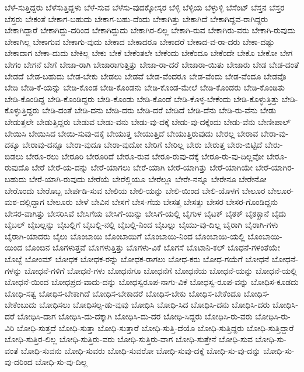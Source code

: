 {ಬೆಳೆ-ಸುತ್ತಿದ್ದರು
ಬೆಳೆಸುತ್ತಿದ್ದಳು
ಬೆಳೆ-ಸುವ
ಬೆಳೆಸು-ವುದಕ್ಕೋಸ್ಕರ
ಬೆಳ್ಳಿ
ಬೆಳ್ಳಿಯ
ಬೆಳ್ಳುಳ್ಳಿ
ಬೆಸೆಂಟ್
ಬೆಸ್ತನ
ಬೆಸ್ತರ
ಬೆಸ್ತರು
ಬೇಕಂತೆ
ಬೇಕಾಗ-ಬಹುದು
ಬೇಕಾಗ-ಬಹು-ದೆಂದು
ಬೇಕಾಗಿತ್ತು
ಬೇಕಾಗಿದೆ
ಬೇಕಾಗಿದ್ದವ-ರಾಗಿದ್ದರು
ಬೇಕಾಗಿದ್ದಾರೆ
ಬೇಕಾಗಿದ್ದು-ದರಿಂದ
ಬೇಕಾಗಿದ್ದುದು
ಬೇಕಾಗಿರ-ಲಿಲ್ಲ
ಬೇಕಾಗಿ-ರುವ
ಬೇಕಾಗಿರು-ವರು
ಬೇಕಾಗಿ-ರುವುದು
ಬೇಕಾಗಿಲ್ಲ
ಬೇಕಾಗುವ
ಬೇಕಾಗು-ವುದು
ಬೇಕಾದ
ಬೇಕಾದರೂ
ಬೇಕಾದರೆ
ಬೇಕಾದ-ವ-ರಾ-ದರು
ಬೇಕಾ-ದಷ್ಟು
ಬೇಕಾದಾಗ
ಬೇಕಾ-ದುದು
ಬೇಕಿಲ್ಲ
ಬೇಕು
ಬೇಕೆ
ಬೇಕೆಂತಲೇ
ಬೇಕೆಂದು
ಬೇಕೆಂದೂ
ಬೇಕೆಂದೇ
ಬೇಕೊ
ಬೇಕೋ
ಬೇಗ
ಬೇಗಂ
ಬೇಗನೆ
ಬೇಗೆ
ಬೇಜಾ-ರಾಗಿ
ಬೇಜಾರಾಗುತ್ತಿತ್ತು
ಬೇಜಾ-ರಾ-ದರೆ
ಬೇಜಾರಾ-ಯಿತು
ಬೇಜಾರು
ಬೇಡ
ಬೇಡ-ದಂತೆ
ಬೇಡದೆ
ಬೇಡ-ಬಹುದು
ಬೇಡ-ಬೇಕು
ಬೇಡಲು
ಬೇಡವೆ
ಬೇಡ-ವೆಂದರೂ
ಬೇಡ-ವೆಂದು
ಬೇಡ-ವೆಂದೂ
ಬೇಡವೊ
ಬೇಡಿ
ಬೇಡಿ-ಕೆ-ಯನ್ನು
ಬೇಡಿ-ಕೊಂಡ
ಬೇಡಿ-ಕೊಂಡನು
ಬೇಡಿ-ಕೊಂಡ-ಮೇಲೆ
ಬೇಡಿ-ಕೊಂಡರು
ಬೇಡಿ-ಕೊಂಡಿತು
ಬೇಡಿ-ಕೊಂಡಿದ್ದ
ಬೇಡಿ-ಕೊಂಡಿದ್ದರು
ಬೇಡಿ-ಕೊಂಡು
ಬೇಡಿ-ಕೊಂಡೆ
ಬೇಡಿ-ಕೊಳ್ಳ-ಬೇಕೆಂದು
ಬೇಡಿ-ಕೊಳ್ಳುತ್ತಿತ್ತು
ಬೇಡಿ-ಕೊಳ್ಳುತ್ತಿದ್ದರು
ಬೇಡಿ-ದಂತೆ
ಬೇಡಿ-ದನು
ಬೇಡಿ-ದರು
ಬೇಡಿ-ದರೆ
ಬೇಡಿದೆ
ಬೇಡಿ-ದೆನು
ಬೇಡಿ-ರು-ವೆನು
ಬೇಡು
ಬೇಡುತ್ತಲೇ
ಬೇಡುತ್ತಿದ್ದರು
ಬೇಡುವ
ಬೇಡು-ವನು
ಬೇಡು-ವು-ದಕ್ಕೆ
ಬೇಡು-ವು-ದಕ್ಕೆಂದು
ಬೇಡು-ವೆನು
ಬೇಣೀಪಾಲ್
ಬೇಯಿಸಿ
ಬೇಯಿಸಿದ
ಬೇಯಿ-ಸುವು-ದಕ್ಕೆ
ಬೇಯುತ್ತ
ಬೇಯುತ್ತಿದೆ
ಬೇಯುತ್ತಿರುವುದು
ಬೇರಲ್ಲ
ಬೇರಾವ
ಬೇರಾ-ವು-ದಕ್ಕೂ
ಬೇರಾವು-ದನ್ನೂ
ಬೇರಾ-ವುದೂ
ಬೇರಾ-ವುದೋ
ಬೇರಿಗೆ
ಬೇರಿಲ್ಲ
ಬೇರು
ಬೇರುತ್ತ
ಬೇರು-ಬಿಟ್ಟಿದೆ
ಬೇರು-ಬಿಡಲು
ಬೇರೂ-ರಲು
ಬೇರೂರಿ
ಬೇರೂರಿದೆ
ಬೇರೂ-ರುವ
ಬೇರೂ-ರುವು-ದಕ್ಕೆ
ಬೇರೂ-ರು-ವು-ದಿಲ್ಲವೋ
ಬೇರೂ-ರುವುದೊ
ಬೇರೆ
ಬೇರೆ-ಯ-ದನ್ನು
ಬೇರೆ-ಯಾಗಲು
ಬೇರೆ-ಯಾಗಿ
ಬೇರೆ-ಯಾಗಿತ್ತು
ಬೇರೆ-ಯಾಗಿಯೇ
ಬೇರೆ-ಯಾಗಿರ-ಬಹುದು
ಬೇರೆ-ಯಾಗಿ-ರುವುದು
ಬೇರೆಯೆ
ಬೇರೆಲ್ಲಿಯೂ
ಬೇರೆಲ್ಲೂ
ಬೇರೇ-ನನ್ನೂ
ಬೇರೇನೂ
ಬೇರೇನೋ
ಬೇರೊಂದು
ಬೇರೊಬ್ಬ
ಬೇರ್ಪಡಿ-ಸುವ
ಬೇಲಿಯ
ಬೇಲಿ-ಯನ್ನು
ಬೇಲಿ-ಯಿಂದ
ಬೇಲಿ-ಯೊಳಗೆ
ಬೇಲೂರ
ಬೇಲೂರ-ಮಠ-ದಲ್ಲಿದ್ದಾಗ
ಬೇಲೂರು
ಬೇಳೆ
ಬೇವಿನ
ಬೇಸಗೆ
ಬೇಸ-ಗೆಯ
ಬೇಸತ್ತ
ಬೇಸತ್ತು
ಬೇಸರ
ಬೇಸರ-ಗೊಂಡಿದ್ದನು
ಬೇಸರ-ವಾಗಿತ್ತು
ಬೇಸರಿಸಿವೆ
ಬೇಸಿಗೆಯ
ಬೇಸಿಗೆ-ಯನ್ನು
ಬೇಸಿಗೆ-ಯಲ್ಲಿ
ಬೈಗುಳ
ಬೈಟಕ್
ಬೈಠಕ್
ಬೈಠಕ್ಖಾನೆ
ಬೈದು
ಬೈಬಲ್
ಬೈಬಲ್ಲನ್ನು
ಬೈಬಲ್ಲಿಗೆ
ಬೈಬಲ್ಲಿ-ನಲ್ಲಿ
ಬೈಬಲ್ಲಿ-ನಿಂದ
ಬೈಬಲ್ಲು
ಬೈಯು-ವು-ದಿಲ್ಲ
ಬೈರಾಗಿ
ಬೈರಾಗಿ-ಗಳು
ಬೈರಾಗಿ-ಯಾದರು
ಬೈಲು
ಬೊಂಬಾಯಿ
ಬೊಂಬಾಯಿಗೆ
ಬೊಂಬಾಯಿ-ನಿಂದ
ಬೊಂಬಾಯಿ-ಯಲ್ಲಿ
ಬೊಂಬಾಯಿ-ಯಿಂದ
ಬೊಂಬಿನ
ಬೊಗಳುತ್ತವೆ
ಬೊಗಳುತ್ತಿತ್ತು
ಬೊಗಳು-ವಿಕೆ
ಬೊಗಸೆ
ಬೊಟಾನಿ-ಕಲ್
ಬೊಧನೆ-ಗಳಂತೆಯೇ
ಬೊಬ್ಬೆ
ಬೋಂಮ್
ಬೋಧಕ
ಬೋಧಕ-ರನ್ನು
ಬೋಧಕ-ರಾಗಲು
ಬೋಧ-ಕರು
ಬೋಧ-ಗಯೆಗೆ
ಬೋಧನೆ
ಬೋಧನೆ-ಗಳನ್ನು
ಬೋಧನೆ-ಗಳಿಗೆ
ಬೋಧನೆ-ಗಳು
ಬೋಧನೆಗೂ
ಬೋಧನೆಗೆ
ಬೋಧನೆಯ
ಬೋಧನೆ-ಯನ್ನು
ಬೋಧನೆ-ಯಲ್ಲಿ
ಬೋಧನೆ-ಯಿಂದ
ಬೋಧಪ್ರದ-ವಾದು-ದನ್ನು
ಬೋಧಸ್ವರೂಪ-ನಾಗು-ವಿಕೆ
ಬೋಧಸ್ವ-ರೂಪ-ವನ್ನು
ಬೋಧಿಸ-ಕೂಡದು
ಬೋಧಿ-ಸತ್ವ
ಬೋಧಿಸ-ಬೇಕಾಗಿದೆ
ಬೋಧಿಸ-ಬೇಕಾದರೆ
ಬೋಧಿಸ-ಬೇಕು
ಬೋಧಿಸ-ಬೇಕೆಂದೂ
ಬೋಧಿಸ-ಬೇಕೆಂಬುದು
ಬೋಧಿಸಲು
ಬೋಧಿಸಲ್ಪ-ಡು-ವುವು
ಬೋಧಿಸಿ
ಬೋಧಿ-ಸಿದ
ಬೋಧಿಸಿ-ದನು
ಬೋಧಿಸಿ-ದರು
ಬೋಧಿಸಿ-ದರೆ
ಬೋಧಿಸಿ-ದಾಗ
ಬೋಧಿಸಿ-ದು-ದಕ್ಕಾಗಿ
ಬೋಧಿಸಿ-ದು-ದರ
ಬೋಧಿ-ಸಿದ್ದರು
ಬೋಧಿಸಿ-ರು-ವರು
ಬೋಧಿಸಿ-ರು-ವಿರಿ
ಬೋಧಿ-ಸುತ್ತದೆ
ಬೋಧಿ-ಸುತ್ತಾ
ಬೋಧಿ-ಸುತ್ತಾರೆ
ಬೋಧಿ-ಸುತ್ತಿ-ದೆಯೊ
ಬೋಧಿ-ಸುತ್ತಿದ್ದರು
ಬೋಧಿ-ಸುತ್ತಿದ್ದಾರೆ
ಬೋಧಿ-ಸುತ್ತಿರ-ಲಿಲ್ಲ
ಬೋಧಿ-ಸುತ್ತಿರು-ವರು
ಬೋಧಿ-ಸುತ್ತಿರು-ವಾಗ
ಬೋಧಿ-ಸುತ್ತೇನೆ
ಬೋಧಿ-ಸುವ
ಬೋಧಿ-ಸು-ವಂತೆ
ಬೋಧಿ-ಸುವನು
ಬೋಧಿ-ಸುವರು
ಬೋಧಿ-ಸುವರೋ
ಬೋಧಿ-ಸುವು-ದಕ್ಕೆ
ಬೋಧಿ-ಸು-ವು-ದನ್ನು
ಬೋಧಿ-ಸು-ವು-ದರಿಂದ
ಬೋಧಿ-ಸು-ವು-ದಿಲ್ಲ
}

